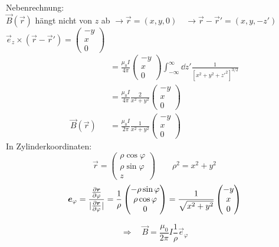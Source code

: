 Nebenrechnung:\\
$ \vec{B}(\vec{r}) $ hängt nicht von $ z $ ab $ \rightarrow \vec{r} = (x,y,0) \quad \rightarrow \vec{r} - \vec{r}' = (x,y,-z') $\\
$ \vec{e}_z \times (\vec{r} - \vec{r}') = \begin{pmatrix}
-y \\ x \\ 0
\end{pmatrix} $
\begin{align*}
\qquad \qquad &= \frac{\mu_0 I}{4 \pi} \begin{pmatrix}
-y \\ x \\ 0
\end{pmatrix} \int_{-\infty}^{\infty} \dd z' \frac{1}{[x^2 + y^2 + z'^2]^{3/2}} \tag{*} \label{integral}\\
&= \frac{\mu_0 I}{4 \pi} \frac{2}{x^2 + y^2} \begin{pmatrix}
-y \\ x \\ 0
\end{pmatrix}\\
\vec{B} (\vec{r}) &= \frac{\mu_0 I}{2 \pi} \frac{1}{x^2 + y^2} \begin{pmatrix}
-y \\ x \\ 0
\end{pmatrix}
\end{align*}
In Zylinderkoordinaten:
\begin{equation*}
\vec{r} = \begin{pmatrix}
\rho \cos \varphi \\ \rho \sin \varphi \\ z
\end{pmatrix} \qquad \rho^2 = x^2 + y^2
\end{equation*}
\begin{equation*}
\bm{e}_{\varphi} = \frac{\frac{\partial \bm{r}}{\partial \varphi}}{|\frac{\partial \bm{r}}{\partial \varphi}|} = \frac{1}{\rho} \begin{pmatrix}
- \rho \sin \varphi \\ \rho \cos \varphi \\ 0
\end{pmatrix} = \frac{1}{\sqrt{x^2 + y^2}} \begin{pmatrix}
-y \\ x \\ 0
\end{pmatrix}
\end{equation*}
\begin{minipage}{.5\linewidth}
	\begin{equation*}
	\Rightarrow \quad \vec{B} = \frac{\mu_0}{2 \pi} I \frac{1}{\rho} \vec{e}_{\varphi}
	\end{equation*}
\end{minipage}%
